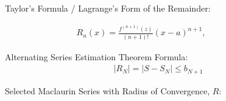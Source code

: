{\sc Taylor's Formula / Lagrange's Form of the Remainder:}

\begin{eqnarray*}
R_n(x) = \frac{f^{(n+1)}(z)}{(n+1)!}(x-a)^{n+1}, \qquad \qquad %
\end{eqnarray*}



{\sc Alternating Series Estimation Theorem Formula:}
\begin{eqnarray*}
|R_N| = \left| S - S_N \right | \leq b_{N+1}
\end{eqnarray*}



\vspace*{.1in}

%
%
%
%
%
%
%
%
%


{\sc Selected Maclaurin Series with Radius of Convergence, \(R\):}

